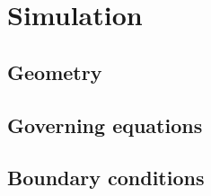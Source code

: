 \documentclass[../main.tex]{subfiles}
\begin{document}
\section{Simulation}

\blindtext

\subsection{Geometry}
\blindtext

\subsection{Governing equations}
\blindtext {}

\subsection{Boundary conditions}
\blindtext
\end{document}
